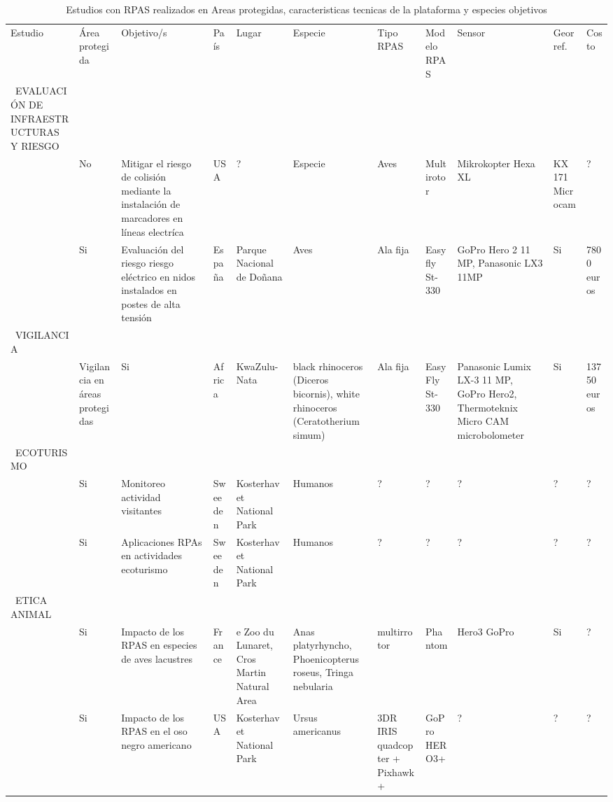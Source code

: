 \documentclass[twocolumn]{extarticle}
\begin{document}
\begin{sidewaystable}
  \centering
  \captionsetup{font=scriptsize,labelfont=scriptsize}
  \caption{Estudios con RPAS realizados en Areas protegidas, caracteristicas tecnicas de la plataforma y especies objetivos}
  \label{my-label}
  \tiny
  \begin{tabular}{p{2.5cm}p{1cm}p{3cm}p{1cm}p{2cm}p{2cm}p{1cm}p{2cm}p{2cm}p{1cm}p{0.5cm}}
  \cmidrule(r){1-11}
  
  Estudio & Área protegida & Objetivo/s & País & Lugar & Especie & Tipo RPAS & Modelo RPAS & Sensor & Georref. & Costo \\ \cmidrule(r){1-11}
  
  
  \ EVALUACIÓN DE INFRAESTRUCTURAS Y RIESGO \\
  
  \cite{Lobermeier2015} & No  & Mitigar el riesgo de colisión mediante la instalación de marcadores en líneas electríca & USA & ? & Especie& Aves  & Multirotor  & Mikrokopter Hexa XL  & KX 171 Microcam & ?  \\ 
  
  \cite{Mulero-Pazmany2014a} & Si  & Evaluación del riesgo riesgo eléctrico en nidos instalados en postes de alta tensión & España & Parque Nacional de Doñana &  Aves  & Ala fija  & Easy fly St-330 & GoPro Hero 2 11 MP, Panasonic LX3 11MP & Si & 7800 euros  \\ 
  
  
  \ VIGILANCIA \\ 
  
  \cite{Mulero-Pazmany2014}  & Vigilancia en áreas protegidas & Si & Africa & KwaZulu-Nata & black rhinoceros
  (Diceros bicornis), white rhinoceros (Ceratotherium simum)  & Ala fija  & Easy Fly St-330 & Panasonic Lumix LX-3 11 MP, GoPro Hero2, Thermoteknix Micro CAM microbolometer & Si & 13750 euros  \\ 

  
  \ ECOTURISMO  \\
  
  \cite{Hansen2016} & Si  & Monitoreo actividad visitantes  & Sweeden & Kosterhavet National Park &  Humanos  & ?  & ? & ?  & ? & ?  \\ 
  \cite{King2014} & Si  & Aplicaciones RPAs en actividades ecoturismo   & Sweeden & Kosterhavet National Park &  Humanos  & ?  & ? & ?  & ? & ?  \\ 
  
  
  \ ETICA ANIMAL  \\
  \cite{Vas2015} & Si  & Impacto de los RPAS en especies de aves lacustres  & France & e Zoo du Lunaret, Cros Martin Natural Area &  Anas platyrhyncho, Phoenicopterus roseus, Tringa nebularia  & multirrotor &  Phantom & Hero3 GoPro & Si  & ?  \\ 
  \cite{Ditmer2015} & Si  & Impacto de los RPAS en el oso negro americano   & USA & Kosterhavet National Park &  Ursus americanus  & 3DR IRIS quadcopter + Pixhawk +   & GoPro HERO3+ & ?  & ? & ?  \\ 

  
  \end{tabular}
  \end{sidewaystable}

\newpage
\singlespacing 

\end{document}
